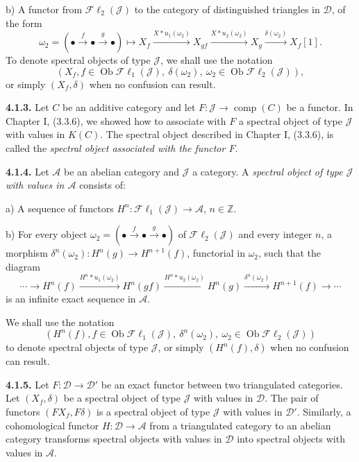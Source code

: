 \clearpage
{}%
\begingroup\small\setlength{\parskip}{0pt}\setlength{\emergencystretch}{1.5em}
b) A functor from $\mathcal{F}\ell_2(\mathcal J)$ to the category of
distinguished triangles in $\mathcal D$, of the form
\[
\omega_2=(\mathord\bullet\xrightarrow f\mathord\bullet\xrightarrow g\mathord\bullet)
\longmapsto
X_f\xrightarrow{X*u_1(\omega_2)}X_{gf}
\xrightarrow{X*u_2(\omega_2)}X_g
\xrightarrow{\delta(\omega_2)}X_f[1].
\]
To denote spectral objects of type $\mathcal J$, we shall use the notation
\[
(X_f, f\in\operatorname{Ob}\mathcal{F}\ell_1(\mathcal J),\
\delta(\omega_2),
\ \omega_2\in\operatorname{Ob}\mathcal{F}\ell_2(\mathcal J)),
\]
or simply $(X_f,\delta)$ when no confusion can result.

\medskip\noindent\textbf{4.1.3.}\quad
Let $C$ be an additive category and let
$F\colon\mathcal J\longrightarrow\operatorname{comp}(C)$ be a functor. In
Chapter I, (3.3.6), we showed how to associate with $F$ a spectral object of
type $\mathcal J$ with values in $K(C)$. The spectral object described in
Chapter I, (3.3.6), is called the \emph{spectral object associated with the
functor $F$}.

\medskip\noindent\textbf{4.1.4.}\quad
Let $\mathcal A$ be an abelian category and $\mathcal J$ a category. A
\emph{spectral object of type $\mathcal J$ with values in $\mathcal A$}
consists of:

a) A sequence of functors
$H^n\colon\mathcal{F}\ell_1(\mathcal J)\longrightarrow\mathcal A$,
$n\in\mathbb Z$.

b) For every object
$\omega_2=(\mathord\bullet\xrightarrow f\mathord\bullet\xrightarrow g\mathord\bullet)$
of $\mathcal{F}\ell_2(\mathcal J)$ and every integer $n$, a morphism
$\delta^n(\omega_2)\colon H^n(g)\to H^{n+1}(f)$, functorial in $\omega_2$,
such that the diagram
\[
\cdots\longrightarrow H^n(f)
\xrightarrow{H^n*u_1(\omega_2)}H^n(gf)
\xrightarrow{H^n*u_2(\omega_2)}H^n(g)
\xrightarrow{\delta^n(\omega_2)}H^{n+1}(f)
\longrightarrow\cdots
\]
is an infinite exact sequence in $\mathcal A$.

We shall use the notation
\[
(H^n(f), f\in\operatorname{Ob}\mathcal{F}\ell_1(\mathcal J),\
\delta^n(\omega_2),
\ \omega_2\in\operatorname{Ob}\mathcal{F}\ell_2(\mathcal J))
\]
to denote spectral objects of type $\mathcal J$, or simply
$(H^n(f),\delta)$ when no confusion can result.

\medskip\noindent\textbf{4.1.5.}\quad
Let $F\colon\mathcal D\to\mathcal D'$ be an exact functor between two
triangulated categories. Let $(X_f,\delta)$ be a spectral object of type
$\mathcal J$ with values in $\mathcal D$. The pair of functors
$(FX_f,F\delta)$ is a spectral object of type $\mathcal J$ with values in
$\mathcal D'$. Similarly, a cohomological functor
$H\colon\mathcal D\to\mathcal A$ from a triangulated category to an
abelian category transforms spectral objects with values in $\mathcal D$
into spectral objects with values in $\mathcal A$.

